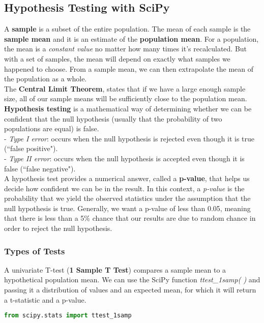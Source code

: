 \documentclass[11pt, a4paper]{article}
\begin{document}
\begin{spacing}{1.1}
	\subsection{Hypothesis Testing with SciPy}
	A \textbf{sample} is a subset of the entire population. The mean of each sample is the \textbf{sample mean} and it is an estimate of the \textbf{population mean}. For a population, the mean is a \textit{constant value} no matter how many times it’s recalculated. But with a set of samples, the mean will depend on exactly what samples we happened to choose. From a sample mean, we can then extrapolate the mean of the population as a whole. \vspace*{1mm} \\
	The \textbf{Central Limit Theorem}, states that if we have a large enough sample size, all of our sample means will be sufficiently close to the population mean. \vspace*{1mm} \\
	\textbf{Hypothesis testing} is a mathematical way of determining whether we can be confident that the null hypothesis (usually that the probability of two populations are equal) is false. \\
	\hspace*{3mm} - \textit{Type I error}: occurs when the null hypothesis is rejected even though it is true (``false positive"). \\
	\hspace*{3mm} - \textit{Type II error}: occurs when the null hypothesis is accepted even though it is false (``false negative"). \vspace*{.2mm} \\
	A hypothesis test provides a numerical answer, called a \textbf{p-value}, that helps us decide how confident we can be in the result. In this context, a \textit{p-value} is the probability that we yield the observed statistics under the assumption that the null hypothesis is true. Generally, we want a p-value of less than 0.05, meaning that there is less than a 5\% chance that our results are due to random chance in order to reject the null hypothesis. \newpage
	\subsubsection{Types of Tests}
	A univariate T-test (\textbf{1 Sample T Test}) compares a sample mean to a hypothetical population mean. We can use the SciPy function \textit{ttest\_1samp( )} and passing it a distribution of values and an expected mean, for which it will return a t-statistic and a p-value. 
	\begin{lstlisting}[language=Python]
	from scipy.stats import ttest_1samp
	

\end{lstlisting}
\end{spacing}
\end{document}
